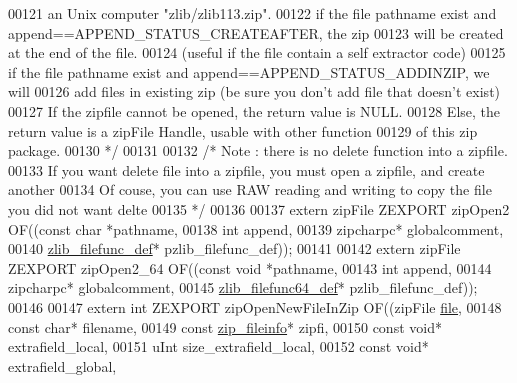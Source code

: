 \begin{DoxyCode}
00121 \textcolor{comment}{       an Unix computer "zlib/zlib113.zip".}
00122 \textcolor{comment}{     if the file pathname exist and append==APPEND\_STATUS\_CREATEAFTER, the zip}
00123 \textcolor{comment}{       will be created at the end of the file.}
00124 \textcolor{comment}{         (useful if the file contain a self extractor code)}
00125 \textcolor{comment}{     if the file pathname exist and append==APPEND\_STATUS\_ADDINZIP, we will}
00126 \textcolor{comment}{       add files in existing zip (be sure you don't add file that doesn't exist)}
00127 \textcolor{comment}{     If the zipfile cannot be opened, the return value is NULL.}
00128 \textcolor{comment}{     Else, the return value is a zipFile Handle, usable with other function}
00129 \textcolor{comment}{       of this zip package.}
00130 \textcolor{comment}{*/}
00131 
00132 \textcolor{comment}{/* Note : there is no delete function into a zipfile.}
00133 \textcolor{comment}{   If you want delete file into a zipfile, you must open a zipfile, and create another}
00134 \textcolor{comment}{   Of couse, you can use RAW reading and writing to copy the file you did not want delte}
00135 \textcolor{comment}{*/}
00136 
00137 \textcolor{keyword}{extern} zipFile ZEXPORT zipOpen2 OF((\textcolor{keyword}{const} \textcolor{keywordtype}{char} *pathname,
00138                                    \textcolor{keywordtype}{int} append,
00139                                    zipcharpc* globalcomment,
00140                                    \hyperlink{structzlib__filefunc__def__s}{zlib\_filefunc\_def}* pzlib\_filefunc\_def));
00141 
00142 \textcolor{keyword}{extern} zipFile ZEXPORT zipOpen2\_64 OF((\textcolor{keyword}{const} \textcolor{keywordtype}{void} *pathname,
00143                                    \textcolor{keywordtype}{int} append,
00144                                    zipcharpc* globalcomment,
00145                                    \hyperlink{structzlib__filefunc64__def__s}{zlib\_filefunc64\_def}* pzlib\_filefunc\_def));
00146 
00147 \textcolor{keyword}{extern} \textcolor{keywordtype}{int} ZEXPORT zipOpenNewFileInZip OF((zipFile \hyperlink{structfile}{file},
00148                        \textcolor{keyword}{const} \textcolor{keywordtype}{char}* filename,
00149                        \textcolor{keyword}{const} \hyperlink{structzip__fileinfo}{zip\_fileinfo}* zipfi,
00150                        \textcolor{keyword}{const} \textcolor{keywordtype}{void}* extrafield\_local,
00151                        uInt size\_extrafield\_local,
00152                        \textcolor{keyword}{const} \textcolor{keywordtype}{void}* extrafield\_global,

\end{DoxyCode}
